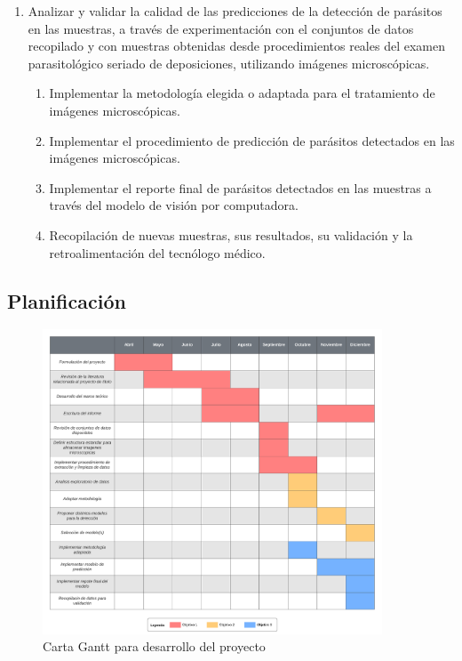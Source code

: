 \documentclass[letter,12pt]{report}
\begin{document}
\begin{enumerate}
    \item Analizar y validar la calidad de las predicciones de la detección de parásitos en
        las muestras, a través de experimentación con el conjuntos de datos recopilado y
        con muestras obtenidas desde procedimientos reales del examen parasitológico
        seriado de deposiciones, utilizando imágenes microscópicas.
        \begin{enumerate}
            \item Implementar la metodología elegida o adaptada para el tratamiento de
                imágenes microscópicas.
            \item Implementar el procedimiento de predicción de parásitos detectados en las
                imágenes microscópicas.
            \item Implementar el reporte final de parásitos detectados en las muestras a
                través del modelo de visión por computadora.
            \item Recopilación de nuevas muestras, sus resultados, su validación y la
                retroalimentación del tecnólogo médico.
        \end{enumerate}
\end{enumerate}

\subsection{Planificación}
\begin{figure}[H]
    \centering
    \includegraphics[width=0.9\textwidth]{gantt}
    \caption{Carta Gantt para desarrollo del proyecto}
    \label{fig:gantt}
\end{figure}
\end{document}
